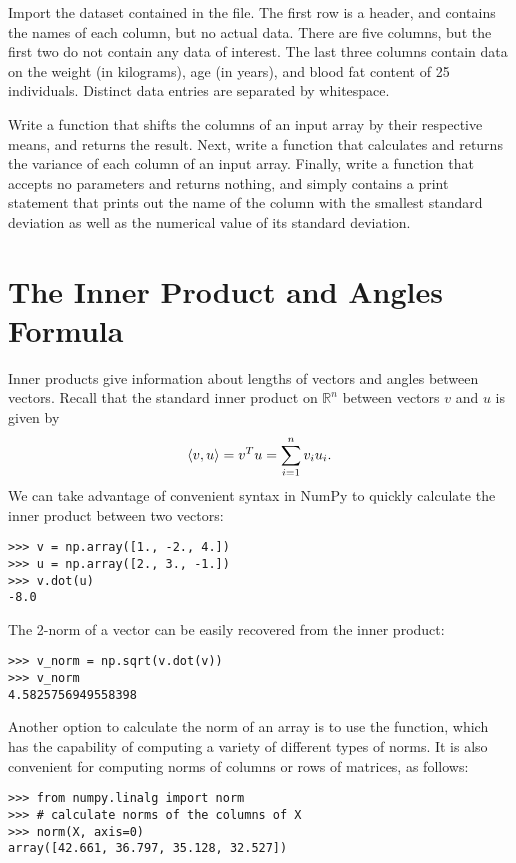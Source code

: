 \begin{problem}
\label{prob:shiftdata}
Import the dataset contained in the  file. The first row is a header, and contains the names
of each column, but no actual data. There are five columns, but the first two do not contain any data of interest.
The last three columns contain data on the weight (in kilograms), age (in years), and blood fat content of 25
individuals. Distinct data entries are separated by whitespace.

Write a function  that shifts the columns of an input array by their respective means, and returns the result.
Next, write a function  that calculates and returns the variance of each column of an input array.
Finally, write a function  that accepts no parameters and returns nothing, and simply contains a print
statement that prints out the name of the column with the smallest standard deviation as well as the numerical value of
its standard deviation.

\end{problem}

\section*{The Inner Product and Angles Formula}

Inner products give information about lengths of vectors and angles between vectors.
Recall that the standard inner product on $\mathbb{R}^n$ between vectors $v$ and $u$ is given by
\[
\langle v,u \rangle = v^T u = \displaystyle\sum_{i=1}^n v_iu_i.
\]
We can take advantage of convenient syntax in NumPy to quickly calculate the inner product between two vectors:
\begin{lstlisting}
>>> v = np.array([1., -2., 4.])
>>> u = np.array([2., 3., -1.])
>>> v.dot(u)
-8.0
\end{lstlisting}
The 2-norm of a vector can be easily recovered from the inner product:
\begin{lstlisting}
>>> v_norm = np.sqrt(v.dot(v))
>>> v_norm
4.5825756949558398
\end{lstlisting}
Another option to calculate the norm of an array is to use the  function, which has the
capability of computing a variety of different types of norms. 
It is also convenient for computing norms of columns or rows of matrices, as follows:
\begin{lstlisting}
>>> from numpy.linalg import norm
>>> # calculate norms of the columns of X
>>> norm(X, axis=0)
array([42.661, 36.797, 35.128, 32.527])
\end{lstlisting}

